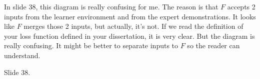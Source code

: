 



\begin{revcomment}
  In slide 38,
  this diagram is really confusing for me.
  The reason is that $F$ accepts 2 inputs from the learner environment and from the expert demonstrations.
  It looks like $F$ merges those 2 inputs, but actually, it's not.
  If we read the definition of your loss function defined in your dissertation,
  it is very clear.
  But the diagram is really confusing.
  It might be better to separate inputs to $F$ so the reader can understand.

  {Slide 38.}
\end{revcomment}

